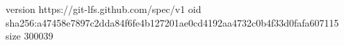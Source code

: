 version https://git-lfs.github.com/spec/v1
oid sha256:a47458e7897c2dda84f6fe4b127201ae0cd4192aa4732c0b4f33d0fafa607115
size 300039
